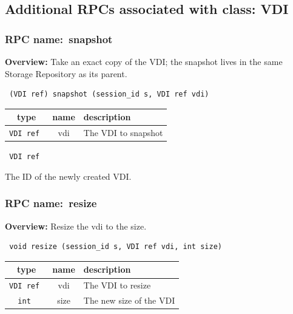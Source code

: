 \subsection{Additional RPCs associated with class: VDI}
\subsubsection{RPC name:~snapshot}

{\bf Overview:} 
Take an exact copy of the VDI; the snapshot lives in the same Storage
Repository as its parent.

\begin{verbatim} (VDI ref) snapshot (session_id s, VDI ref vdi)\end{verbatim}



 
\vspace{0.3cm}
\begin{tabular}{|c|c|p{7cm}|}
 \hline
{\bf type} & {\bf name} & {\bf description} \\ \hline
{\tt VDI ref } & vdi & The VDI to snapshot \\ \hline 

\end{tabular}

\vspace{0.3cm}

{\tt 
VDI ref
}


The ID of the newly created VDI.
\vspace{0.3cm}
\vspace{0.3cm}
\vspace{0.3cm}
\subsubsection{RPC name:~resize}

{\bf Overview:} 
Resize the vdi to the size.

\begin{verbatim} void resize (session_id s, VDI ref vdi, int size)\end{verbatim}



 
\vspace{0.3cm}
\begin{tabular}{|c|c|p{7cm}|}
 \hline
{\bf type} & {\bf name} & {\bf description} \\ \hline
{\tt VDI ref } & vdi & The VDI to resize \\ \hline 

{\tt int } & size & The new size of the VDI \\ \hline 

\end{tabular}

